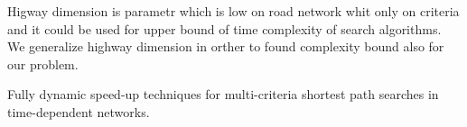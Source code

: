 Higway dimension  \cite{abraham2010highway} is parametr which 
is low on road network whit only on criteria
and it could be used for upper bound of time complexity of search 
algorithms. We generalize highway dimension in orther to found 
complexity bound also for our problem.





Fully dynamic speed-up techniques for multi-criteria shortest path searches in time-dependent networks.
\cite{berger2010fully}

\cite{holte2016bidirectional}
\cite{abraham2012hierarchical}






